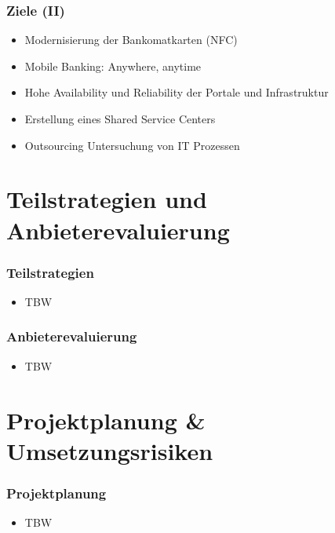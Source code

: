 \documentclass{beamer}
\begin{document}
\begin{frame}
  \frametitle{Ziele (II)}
  \begin{itemize}

	\item Modernisierung der Bankomatkarten (NFC)\vspace{2mm}
	\item Mobile Banking: Anywhere, anytime\vspace{2mm}
	\item Hohe Availability und Reliability der Portale und Infrastruktur\vspace{2mm}
	\item Erstellung eines Shared Service Centers \vspace{2mm}
	\item Outsourcing Untersuchung von IT Prozessen\vspace{2mm}

  \end{itemize}
\end{frame}


\section{Teilstrategien und Anbieterevaluierung}

\begin{frame}
  \frametitle{Teilstrategien}
  \begin{itemize}

	\item TBW

  \end{itemize}
\end{frame}

\begin{frame}
  \frametitle{Anbieterevaluierung}
  \begin{itemize}

	\item TBW

  \end{itemize}
\end{frame}

\section{Projektplanung \& Umsetzungsrisiken}

\begin{frame}
  \frametitle{Projektplanung}
  \begin{itemize}

	\item TBW

  \end{itemize}
\end{frame}
\end{document}
